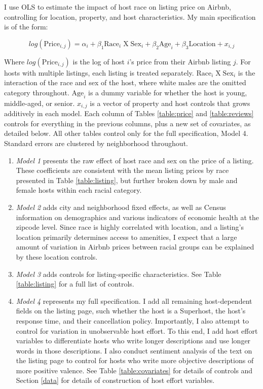 \label{empirical}

I use OLS to estimate the impact of host race on listing price on Airbnb, controlling for location, property, and host characteristics. My main specification is of the form:

\[ log(\text{Price}_{i,j}) = \alpha_i + \beta_1 \text{Race}_{i} \;  \text{X} \; \text{Sex}_i + \beta_2 \text{Age}_i + \beta_3 \text{Location} +  x_{i,j} \]

Where $log(\text{Price}_{i,j})$ is the log of host $i$'s price from their Airbnb listing $j$. For hosts with multiple listings, each listing is treated separately. $\text{Race}_{i} \;  \text{X} \; \text{Sex}_i$ is the interaction of the race and sex of the host, where white males are the omitted category throughout. $\text{Age}_i$ is a dummy variable for whether the host is young, middle-aged, or senior. $x_{i,j}$ is a vector of property and host controls that grows additively in each model. Each column of Tables \ref{table:price} and \ref{table:reviews} controls for everything in the previous columns, plus a new set of covariates, as detailed below. All other tables control only for the full specification, Model 4. Standard errors are clustered by neighborhood throughout.

\begin{enumerate}
	\item \textit{Model 1} presents the raw effect of host race and sex on the price of a listing. These coefficients are consistent with the mean listing prices by race presented in Table \ref{table:listing}, but further broken down by male and female hosts within each racial category.
	
	\item \textit{Model 2} adds city and neighborhood fixed effects, as well as Census information on demographics and various indicators of economic health at the zipcode level. Since race is highly correlated with location, and a listing's location primarily determines access to amenities, I expect that a large amount of variation in Airbnb prices between racial groups can be explained by these location controls.
	
	\item \textit{Model 3} adds controls for listing-specific characteristics. See Table \ref{table:listing} for a full list of controls. 
	
	\item \textit{Model 4} represents my full specification. I add all remaining host-dependent fields on the listing page, such whether the host is a Superhost, the host's response time, and their cancellation policy. Importantly, I also attempt to control for variation in unobservable host effort. To this end, I add host effort variables to differentiate hosts who write longer descriptions and use longer words in those descriptions. I also conduct sentiment analysis of the text on the listing page to control for hosts who write more objective descriptions of more positive valence. See Table \ref{table:covariates} for details of controls and Section \ref{data} for details of construction of host effort variables. 
\end{enumerate}




